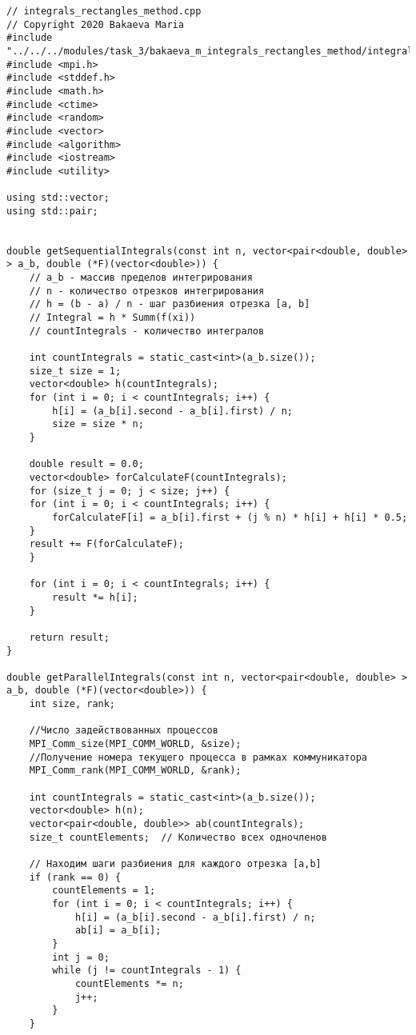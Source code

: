 \documentclass{report}
\begin{document}
\begin{lstlisting}
// integrals_rectangles_method.cpp
// Copyright 2020 Bakaeva Maria
#include "../../../modules/task_3/bakaeva_m_integrals_rectangles_method/integrals_rectangles_method.h"
#include <mpi.h>
#include <stddef.h>
#include <math.h>
#include <ctime>
#include <random>
#include <vector>
#include <algorithm>
#include <iostream>
#include <utility>

using std::vector;
using std::pair;


double getSequentialIntegrals(const int n, vector<pair<double, double> > a_b, double (*F)(vector<double>)) {
    // a_b - массив пределов интегрирования
    // n - количество отрезков интегрирования
    // h = (b - a) / n - шаг разбиения отрезка [a, b]
    // Integral = h * Summ(f(xi))
    // countIntegrals - количество интегралов

    int countIntegrals = static_cast<int>(a_b.size());
    size_t size = 1;
    vector<double> h(countIntegrals);
    for (int i = 0; i < countIntegrals; i++) {
        h[i] = (a_b[i].second - a_b[i].first) / n;
        size = size * n;
    }

    double result = 0.0;
    vector<double> forCalculateF(countIntegrals);
    for (size_t j = 0; j < size; j++) {
    for (int i = 0; i < countIntegrals; i++) {
        forCalculateF[i] = a_b[i].first + (j % n) * h[i] + h[i] * 0.5;
    }
    result += F(forCalculateF);
    }

    for (int i = 0; i < countIntegrals; i++) {
        result *= h[i];
    }

    return result;
}

double getParallelIntegrals(const int n, vector<pair<double, double> > a_b, double (*F)(vector<double>)) {
    int size, rank;

    //Число задействованных процессов
    MPI_Comm_size(MPI_COMM_WORLD, &size);
    //Получение номера текущего процесса в рамках коммуникатора
    MPI_Comm_rank(MPI_COMM_WORLD, &rank);

    int countIntegrals = static_cast<int>(a_b.size());
    vector<double> h(n);
    vector<pair<double, double>> ab(countIntegrals);
    size_t countElements;  // Количество всех одночленов

    // Находим шаги разбиения для каждого отрезка [a,b]
    if (rank == 0) {
        countElements = 1;
        for (int i = 0; i < countIntegrals; i++) {
            h[i] = (a_b[i].second - a_b[i].first) / n;
            ab[i] = a_b[i];
        }
        int j = 0;
        while (j != countIntegrals - 1) {
            countElements *= n;
            j++;
        }
    }


\end{lstlisting}
\end{document}
